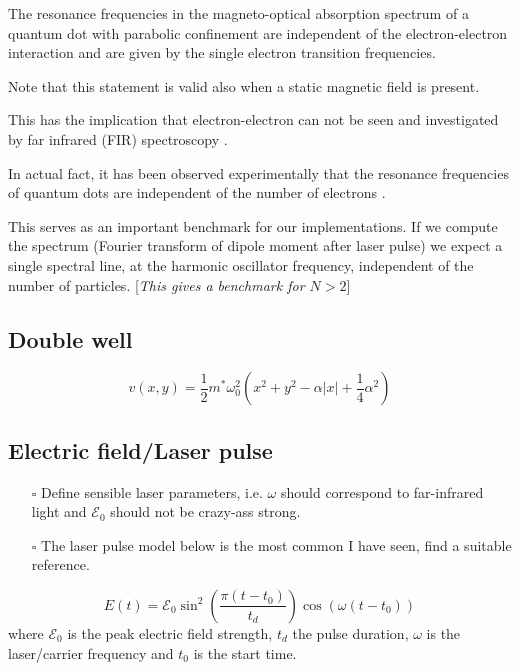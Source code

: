 \documentclass[aip,jcp,reprint,floatfix]{revtex4-1}
\newcommand \mycomment[1]   {{\color{red} [{\it {#1}}]}}
\newcommand{\todo}{$\square$}
\begin{document}
    \begin{displayquote}
    The resonance frequencies in the
    magneto-optical absorption spectrum of a quantum dot
    with parabolic confinement
    are independent of the
    electron-electron interaction and are given by the single
    electron transition frequencies.
    \end{displayquote}
    Note that this statement is valid also when a static magnetic field is present.
    
    This has the implication that electron-electron can not be seen and investigated by far infrared (FIR) spectroscopy \cite{Taut_Broken_Gen_Kohn_2001}.
    
    In actual fact, it has been observed experimentally that the resonance frequencies of quantum dots are independent of the number of electrons
    \cite{Sikorski_Merkt,Sikorski_Merkt_2}.
    
    This serves as an important benchmark for our implementations. If we compute the spectrum (Fourier transform of dipole moment after laser pulse) we expect a single spectral line, at the harmonic oscillator frequency, independent of the number of particles. \mycomment{This gives a benchmark for $N > 2$}
    
    \subsection{Double well}
    \begin{equation}
        v(x,y) = \frac{1}{2}m^* \omega_0^2 \left(x^2+y^2 -\alpha|x|+\frac{1}{4}\alpha^2 \right)
    \end{equation}
    
    \subsection{Electric field/Laser pulse}
    \begin{itemize}
        \item [\todo] Define sensible laser parameters, i.e. $\omega$ should correspond to far-infrared light and $\mathcal{E}_0$ should not be crazy-ass strong.
        \item [\todo] The laser pulse model below is the most common I have seen, find a suitable reference.
    \end{itemize}
    \begin{equation}
        E(t) = \mathcal{E}_0 \sin^2\left(  \frac{\pi(t-t_0)}{t_d} \right) \cos\left(\omega (t-t_0) \right)
    \end{equation}
    where $\mathcal{E}_0$ is the peak electric field strength, $t_d$ the pulse duration, $\omega$ is the laser/carrier frequency and $t_0$ is the start time.
\end{document}
